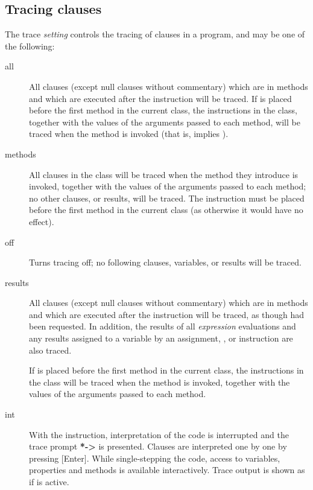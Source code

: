 \subsection{Tracing clauses}
 
The trace \emph{setting} controls the tracing of clauses in a program, and
may be one of the following:
\begin{description}
\item[all]\label{reftrall}
 All clauses (except null clauses without commentary) which are in
methods and which are executed after the  instruction will
be traced.
If  is placed before the first method in the current
class, the  instructions in the class,
together with the values of the arguments passed to each method,
will be traced when the method is invoked (that is, 
implies ).
\item[methods]\label{reftrmeth}
 
All  clauses in the class will be traced when the method
they introduce is invoked, together with the values of the arguments
passed to each method; no other clauses, or results, will be traced.
The  instruction must be placed before the first
method in the current class (as otherwise it would have no effect).
\item[off]\label{reftroff}
 
Turns tracing off; no following clauses, variables, or results will be traced.
\item[results]\label{reftrres}
 All clauses (except null clauses without commentary) which are in
methods and which are executed after the  instruction will
be traced, as though  had been requested.
In addition, the results of all \emph{expression} evaluations and
any results assigned to a variable by an assignment, , or
 instruction are also traced.
 
If  is placed before the first method in the
current class, the  instructions in the class will be
traced when the method is invoked, together with the values of the
arguments passed to each method.
\item[int]\label{reftrres}

With the  instruction, interpretation of the
code is interrupted and the trace prompt \textbf{*->} is presented. Clauses are 
interpreted one by one by pressing [Enter]. While single-stepping the code, access 
to variables, properties and methods is available interactively. 
Trace output is shown as if  is active.

\end{description}
